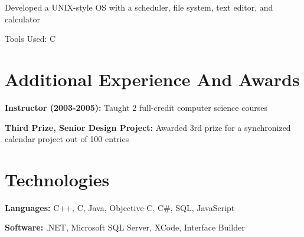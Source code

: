 \documentclass[10pt, letterpaper]{article}
\begin{document}
        \vspace{0.10 cm}
        \begin{onecolentry}
            \begin{highlights}
                \item Developed a UNIX-style OS with a scheduler, file system, text editor, and calculator
                \item Tools Used: C
            \end{highlights}
        \end{onecolentry}



    
    \section{Additional Experience And Awards}



        
        \begin{onecolentry}
            \textbf{Instructor (2003-2005):} Taught 2 full-credit computer science courses
        \end{onecolentry}

        \vspace{0.2 cm}

        \begin{onecolentry}
            \textbf{Third Prize, Senior Design Project:} Awarded 3rd prize for a synchronized calendar project out of 100 entries
        \end{onecolentry}


    
    \section{Technologies}



        
        \begin{onecolentry}
            \textbf{Languages:} C++, C, Java, Objective-C, C\#, SQL, JavaScript
        \end{onecolentry}

        \vspace{0.2 cm}

        \begin{onecolentry}
            \textbf{Software:} .NET, Microsoft SQL Server, XCode, Interface Builder
        \end{onecolentry}


    
\end{document}

